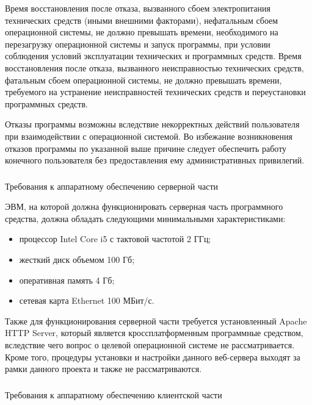 Время восстановления после отказа, вызванного сбоем электропитания технических средств (иными внешними факторами), нефатальным сбоем операционной системы, не должно превышать времени, необходимого на перезагрузку операционной системы и запуск программы, при условии соблюдения условий эксплуатации технических и программных средств. Время восстановления после отказа, вызванного неисправностью технических средств, фатальным сбоем операционной системы, не должно превышать времени, требуемого на устранение неисправностей технических средств и переустановки программных средств.

Отказы программы возможны вследствие некорректных действий пользователя при взаимодействии с операционной системой. Во избежание возникновения отказов программы по указанной выше причине следует обеспечить работу конечного пользователя без предоставления ему административных привилегий.

\subsubsection{} Требования к аппаратному обеспечению серверной части
\label{sec:analysis:specification:server_requirments}

ЭВМ, на которой должна функционировать серверная часть программного средства, должна обладать следующими минимальными характеристиками:

\begin{itemize}
	\item процессор Intel Core i5 с тактовой частотой 2 ГГц;
	\item жесткий диск объемом 100 Гб;
	\item оперативная память 4 Гб;
	\item сетевая карта Ethernet 100 МБит/с.
\end{itemize}

Также для функционирования серверной части требуется установленный Apache HTTP Server, который является кроссплатформенным программные средством, вследствие чего вопрос о целевой операционной системе не рассматривается. Кроме того, процедуры установки и настройки данного веб-сервера выходят за рамки данного проекта и также не рассматриваются.

\subsubsection{} Требования к аппаратному обеспечению клиентской части
\label{sec:analysis:specification:client_requirments}

